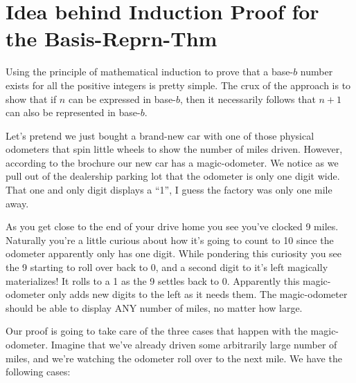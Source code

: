 \documentclass{article}
\begin{document}
\section*{Idea behind Induction Proof for the Basis-Reprn-Thm}
Using the
principle of mathematical induction 
to prove that a base-$b$ number exists for all the positive integers is pretty simple.
The crux of the approach is to show that if $n$ can be expressed in base-$b$,
then it necessarily follows that $n+1$ can also be represented in base-$b$.

Let's pretend we just bought a brand-new car with one of those physical odometers that
spin little wheels to show the number of miles driven. However, according
to the brochure our new car has a magic-odometer.
We notice as we
pull out of the dealership parking lot that
the odometer is only one digit wide.
That one and only digit displays a ``1'', I guess the factory was only one mile away.

As you get close to the end of your drive home
you see you've clocked 9 miles.
Naturally you're a little curious about how it's going to
count to 10 since the odometer apparently only has one digit.
While pondering this curiosity you see the 9 starting to roll
over back to 0, and a second digit to it's left magically materializes!
It rolls to a 1 as the 9 settles back to 0.
Apparently this magic-odometer only adds new digits to the left
as it needs them.
The magic-odometer should be able to display ANY number of miles, no matter how large.

\break
Our proof is going to take care of the three cases that happen with
the magic-odometer. Imagine that we've already driven some arbitrarily large
number of miles, and we're watching the odometer roll over to the
next mile. We have the following cases:
\end{document}
